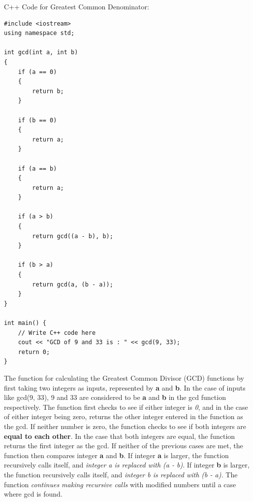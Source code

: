 \documentclass{article}
\theoremstyle{theorem}
\theoremstyle{definition}
\theoremstyle{remark}
\begin{document}
C++ Code for Greatest Common Denominator:
\begin{lstlisting}
#include <iostream>
using namespace std;

int gcd(int a, int b)
{
    if (a == 0)
    {
        return b;
    }

    if (b == 0)
    {
        return a;
    }

    if (a == b)
    {
        return a;
    }

    if (a > b)
    {
        return gcd((a - b), b);
    }

    if (b > a)
    {
        return gcd(a, (b - a));
    }
}

int main() {
    // Write C++ code here
    cout << "GCD of 9 and 33 is : " << gcd(9, 33);
    return 0;
}
\end{lstlisting}

    The function for calculating the Greatest Common Divisor (GCD) functions by first taking two integers as inputs, represented by \textbf{a} and \textbf{b}. In the case of inputs like gcd(9, 33), 9 and 33 are considered to be \textbf{a} and \textbf{b} in the gcd function respectively. The function first checks to see if either integer is \textit{0}, and in the case of either integer being zero, returns the other integer entered in the function as the gcd. If neither number is zero, the function checks to see if both integers are \textbf{equal to each other}. In the case that both integers are equal, the function returns the first integer as the gcd. If neither of the previous cases are met, the function then compares integer \textbf{a} and \textbf{b}. If integer \textbf{a} is larger, the function recursively calls itself, and \textit{integer a is replaced with (a - b)}. If integer \textbf{b} is larger, the function recursively calls itself, and \textit{integer b is replaced with (b - a).} The function \textit{continues making recursive calls} with modified numbers until a case where gcd is found.
\end{document}
